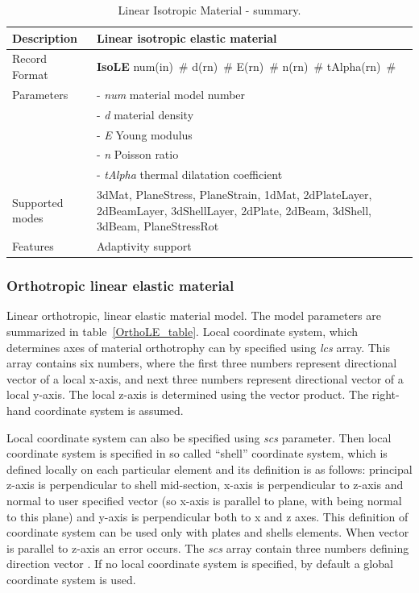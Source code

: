 \documentclass[a4paper]{article}
\newcommand{\descitem}[1]{{\noindent \bf #1}}
\newcommand{\elemparam}[2]{{{#1\tiny (#2)}~\#}}
\newcommand{\param}[1]{{\it #1}}
\begin{document}
\begin{table}[!htb]
\begin{tabular}{|l|p{9cm}|}
\hline
Description & Linear isotropic elastic material\\
\hline
Record Format & \descitem{IsoLE} \elemparam{num}{in}
\elemparam{d}{rn} \elemparam{E}{rn} \elemparam{n}{rn}
\elemparam{tAlpha}{rn}\\
Parameters &- \param{num} material model number\\
&- \param{d} material density\\
&- \param{E} Young modulus\\
&- \param{n} Poisson ratio\\
&- \param{tAlpha} thermal dilatation coefficient\\
Supported modes& 3dMat, PlaneStress, PlaneStrain, 1dMat,
2dPlateLayer, 2dBeamLayer, 3dShellLayer, 2dPlate, 2dBeam, 3dShell,
3dBeam, PlaneStressRot\\
Features & Adaptivity support\\
\hline
\end{tabular}
\caption{Linear Isotropic Material - summary.}
\label{IsoLE_table}
\end{table}



\subsubsection{Orthotropic linear elastic material}
\label{OrthoLE}
Linear orthotropic, linear elastic  material model. The model parameters are summarized
in table~\ref{OrthoLE_table}.
Local coordinate system, which determines axes of material orthotrophy
can by specified using \param{lcs} array. This array contains six numbers,
where the first three numbers represent directional vector of a local x-axis,
and next three numbers represent directional vector of a local y-axis.
The local z-axis is determined using the vector product.
The right-hand coordinate system is assumed.

Local coordinate system
can also be specified using \param{scs} parameter. Then local coordinate
system is specified in so called ``shell''
coordinate system, which is defined locally on each particular element
and its definition is as follows: principal z-axis is perpendicular to
shell mid-section, x-axis is perpendicular to z-axis and normal to
user specified vector (so x-axis is parallel to plane, with  being
normal to this plane) and y-axis is perpendicular both to x and z
axes. This definition of coordinate system can be used only with plates
and shells elements.
When vector  is parallel to z-axis an error occurs. The \param{scs} array contain three numbers
defining direction vector . If no local coordinate system is
specified, by default a global coordinate system is used.
\end{document}
